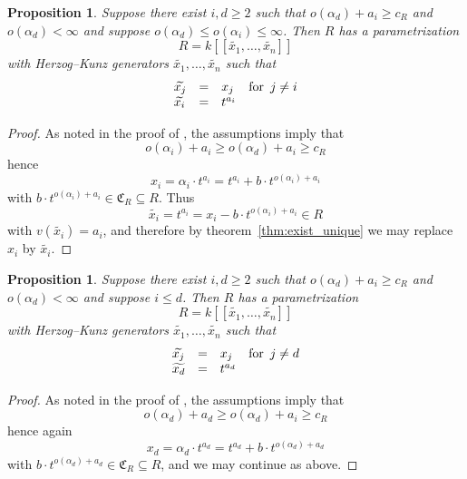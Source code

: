 \documentclass[12pt]{amsart}
\theoremstyle{plain}%
\newtheorem{proposition}[satz]{Proposition}
\theoremstyle{definition}
\renewcommand{\(}{\left(}
\renewcommand{\)}{\right)}
\renewcommand{\leq}{\leqslant}
\renewcommand{\geq}{\geqslant}
\begin{document}
\begin{proposition}\label{prop:MM_4_2_1}
Suppose there exist $i, d \geq 2$ such that $\mathit{o}
(\alpha_d) + a_i \geq c_R$ and $\mathit{o}(\alpha_d) < 
\infty$ and suppose $\mathit{o}(\alpha_d) \leq 
\mathit{o}(\alpha_i) \leq \infty$. Then $R$ has a 
parametrization 
	$$ R = k[[\widetilde{x_1}, \ldots, \widetilde{x_n}]] $$
with Herzog--Kunz generators $\widetilde{x_1}, \ldots, 
\widetilde{x_n}$ such that 
	$$ \begin{array} {l c l l}
	\widetilde{x_j} & = & x_j & \text{for }\, j \neq  i \\
	\widetilde{x_i} & = & t^{a_i} & 
	\end{array} $$ 
\end{proposition}

\begin{proof}
As noted in the proof of \cite[4.2 (1)]{MM}, the assumptions 
imply that 
	$$ \mathit{o}(\alpha_i) + a_i  \geq \mathit{o}(\alpha_d) 
    + a_i \geq c_R $$
hence 
	$$ x_i = \alpha_i \cdot t^{a_i} = t^{a_i} + b \cdot 
    t^{\mathit{o}(\alpha_i) +a_i} $$ 
with $b\cdot t^{\mathit{o}(\alpha_i) +a_i}\in \mathfrak C_R 
\subseteq R$. Thus 
	$$ \widetilde{x_i} = t^{a_i} = x_i - b \cdot 
    t^{\mathit{o}(\alpha_i) +a_i} \in R $$
with $v(\widetilde{x_i}) = a_i$, and therefore by 
theorem~\ref{thm:exist_unique} we may replace $x_i$ by 
$\widetilde{x_i}$. 
\end{proof}

\begin{proposition}\label{prop:MM_4_2_2}
Suppose there exist $i, d \geq 2$ such that 
$\mathit{o}(\alpha_d) + a_i \geq c_R$ and 
$\mathit{o}(\alpha_d) < \infty$ and suppose $i \leq d$. Then 
$R$ has a parametrization 
	$$ R = k[[\widetilde{x_1}, \ldots, \widetilde{x_n} ]] $$
with Herzog--Kunz generators $\widetilde{x_1}, \ldots, 
\widetilde{x_n}$ such that 
	$$ \begin{array} {l c l l}
	\widetilde{x_j} & = & x_j & \text{for }\, j \neq d \\
	\widetilde{x_d} & = & t^{a_d} & 
	\end{array} $$ 
\end{proposition}

\begin{proof}
As noted in the proof of \cite[4.2 (2)]{MM}, the assumptions 
imply that 
	$$ \mathit{o}(\alpha_d)+a_d \geq \mathit{o}(\alpha_d) + 
    a_i \geq c_R $$
hence again
	$$ x_d = \alpha_d \cdot t^{a_d} = 
	t^{a_d} + b \cdot t^{\mathit{o}(\alpha_d) +a_d} $$ 
with $b\cdot t^{\mathit{o}(\alpha_d) +a_d}\in \mathfrak C_R 
\subseteq R$, and we may continue as above. 
\end{proof}
\end{document}
